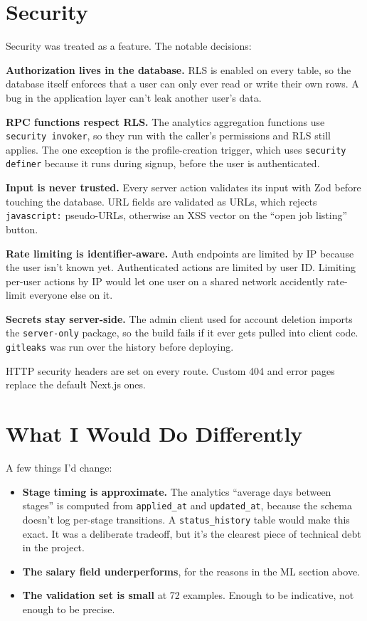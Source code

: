 \documentclass[11pt,a4paper]{article}
\begin{document}
\section{Security}

Security was treated as a feature. The notable
decisions:

\textbf{Authorization lives in the database.} RLS is
enabled on every table, so the database itself enforces that a user can
only ever read or write their own rows. A bug in the application layer
can't leak another user's data.

\textbf{RPC functions respect RLS.} The analytics aggregation functions
use \texttt{security invoker}, so they run with the caller's permissions
and RLS still applies. The one exception is the profile-creation trigger,
which uses \texttt{security definer} because it runs during signup, before
the user is authenticated.

\textbf{Input is never trusted.} Every server action validates its input
with Zod before touching the database. URL fields are validated as URLs,
which rejects \texttt{javascript:} pseudo-URLs, otherwise an XSS vector
on the ``open job listing'' button.

\textbf{Rate limiting is identifier-aware.} Auth endpoints are limited by
IP because the user isn't known yet. Authenticated actions are limited by
user ID. Limiting per-user actions by IP would let one user on a shared
network accidently rate-limit everyone else on it.

\textbf{Secrets stay server-side.} The admin client used for account
deletion imports the \texttt{server-only} package, so the build fails if
it ever gets pulled into client code. \texttt{gitleaks} was run over the
history before deploying.

HTTP security headers are set on every route. Custom 404 and error pages
replace the default Next.js ones.

\section{What I Would Do Differently}

A few things I'd change:

\begin{itemize}
  \item \textbf{Stage timing is approximate.} The analytics ``average days
    between stages'' is computed from \texttt{applied\_at} and
    \texttt{updated\_at}, because the schema doesn't log per-stage
    transitions. A \texttt{status\_history} table would make this exact.
    It was a deliberate tradeoff, but it's the clearest piece of technical
    debt in the project.
  \item \textbf{The salary field underperforms}, for the reasons in the
    ML section above.
  \item \textbf{The validation set is small} at 72 examples. Enough to be
    indicative, not enough to be precise.
\end{itemize}
\end{document}
